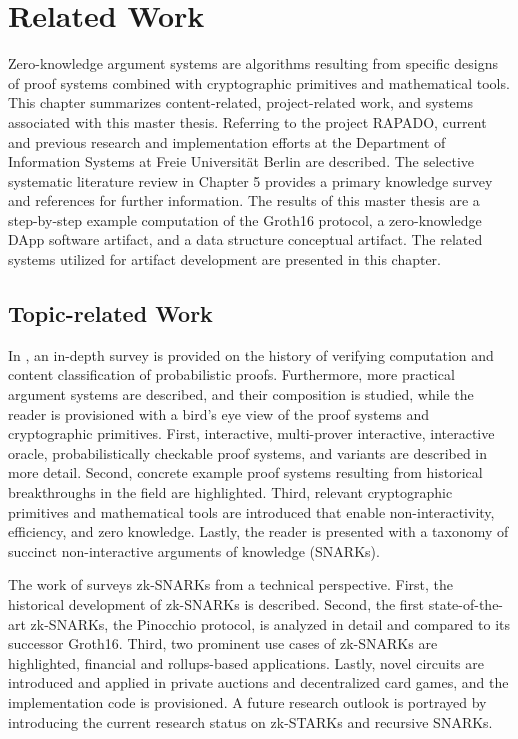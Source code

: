 \chapter{Related Work}
Zero-knowledge argument systems are algorithms resulting from specific designs of proof systems combined with cryptographic primitives and mathematical tools. This chapter summarizes content-related, project-related work, and systems associated with this master thesis. Referring to the project RAPADO, current and previous research and implementation efforts at the Department of Information Systems at Freie Universit{\"a}t Berlin are described. The selective systematic literature review in Chapter 5 provides a primary knowledge survey and references for further information. The results of this master thesis are a step-by-step example computation of the Groth16 protocol, a zero-knowledge DApp software artifact, and a data structure conceptual artifact. The related systems utilized for artifact development are presented in this chapter.

\section{Topic-related Work}
In \citet{Thaler}, an in-depth survey is provided on the history of verifying computation and content classification of probabilistic proofs. Furthermore, more practical argument systems are described, and their composition is studied, while the reader is provisioned with a bird's eye view of the proof systems and cryptographic primitives. First, interactive, multi-prover interactive, interactive oracle, probabilistically checkable proof systems, and variants are described in more detail. Second, concrete example proof systems resulting from historical breakthroughs in the field are highlighted. Third, relevant cryptographic primitives and mathematical tools are introduced that enable non-interactivity, efficiency, and zero knowledge. Lastly, the reader is presented with a taxonomy of succinct non-interactive arguments of knowledge (SNARKs).

The work of \citet{chen2022review} surveys zk-SNARKs from a technical perspective. First, the historical development of zk-SNARKs is described. Second, the first state-of-the-art zk-SNARKs, the Pinocchio protocol, is analyzed in detail and compared to its successor Groth16. Third, two prominent use cases of zk-SNARKs are highlighted, financial and rollups-based applications. Lastly, novel circuits are introduced and applied in private auctions and decentralized card games, and the implementation code is provisioned. A future research outlook is portrayed by introducing the current research status on zk-STARKs and recursive SNARKs.

